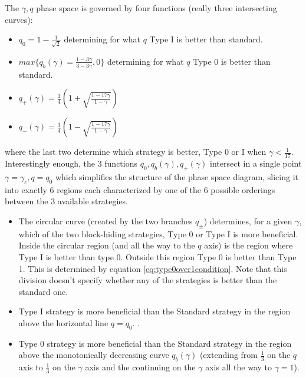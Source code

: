 \documentclass[letterpaper,12pt]{report}
\theoremstyle{plain}
\theoremstyle{definition}
\begin{document}
The $\gamma, q$ phase space is governed by four functions (really three intersecting curves):
\begin{itemize}
\item $q_0= 1-\frac{1}{\sqrt{2}}$ determining for what $q$ Type I is better than standard.
\item $max\lbrace q_b(\gamma)=\frac{1-3\gamma}{3-3\gamma},0\rbrace$ determining for what $q$ Type 0 is better than standard.
\item $q_+(\gamma)=\frac{1}{4}\left(1+\sqrt{\frac{1-17\gamma}{1-\gamma}}\right)$ 
\item $q_-(\gamma)=\frac{1}{4}\left(1-\sqrt{\frac{1-17\gamma}{1-\gamma}}\right)$
\end{itemize}
where the last two determine which strategy is better, Type 0 or I when $\gamma<\frac{1}{17}$.
Interestingly enough, the 3 functions $q_0, q_b(\gamma), q_+(\gamma)$ intersect in a single point $\gamma=\gamma_c, q=q_0$ which simplifies the structure of the phase space diagram, slicing it into exactly 6 regions each characterized by one of the 6 possible orderings between the 3 available strategies.

\begin{itemize}
\item The circular curve (created by the two branches $q_{\pm}$) determines, for a given $\gamma$, which of the two block-hiding strategies, Type 0 or Type I is more beneficial. Inside the circular region (and all the way to the $q$ axis) is the region where Type I is better than type 0. Outside this region Type 0 is better than Type 1. This is determined by equation \ref{eq:type0over1condition}. Note that this division doesn't specify whether any of the strategies is better than the standard one.
\item Type I strategy is more beneficial than the Standard strategy in the region above the horizontal line $q=q_0$. .
\item Type 0 strategy is more beneficial than the Standard strategy in the region above the monotonically decreasing curve $q_b(\gamma)$ (extending from $\frac{1}{3}$ on the $q$ axis to $\frac{1}{3}$ on the $\gamma$ axis and the continuing on the $\gamma$ axis all the way to $\gamma=1$).
\end{itemize}
\end{document}
